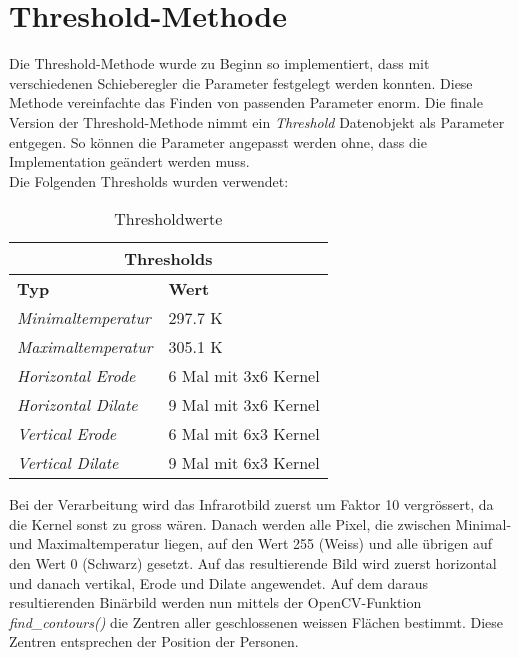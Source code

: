 \section{Threshold-Methode}

Die Threshold-Methode wurde zu Beginn so implementiert, dass mit verschiedenen Schieberegler die Parameter festgelegt werden konnten. Diese Methode vereinfachte das Finden von passenden Parameter enorm. Die finale Version der Threshold-Methode nimmt ein \textit{Threshold} Datenobjekt als Parameter entgegen. So können die Parameter angepasst werden ohne, dass die Implementation geändert werden muss.\\
Die Folgenden Thresholds wurden verwendet:

{
	\renewcommand{\arraystretch}{1.3}

	\begin{table}[H]
		\scriptsize
		\centering
		\begin{tabularx}{.6\textwidth}{XX}\\
			\multicolumn{2}{c}{\textbf{Thresholds}}\\
			\hline
			\textbf{Typ} & \textbf{Wert}\\
			\hline
			\textit{Minimaltemperatur} & 297.7 K\\
			\hline
			\textit{Maximaltemperatur} & 305.1 K\\
			\hline 
			\textit{Horizontal \gls{Erode}} & 6 Mal mit 3x6 Kernel\\
			\hline
			\textit{Horizontal \gls{Dilate}} & 9 Mal mit 3x6 Kernel\\
			\hline
			\textit{Vertical \gls{Erode}} & 6 Mal mit 6x3 Kernel\\
			\hline
			\textit{Vertical \gls{Dilate}} & 9  Mal mit 6x3 Kernel\\
			\hline
		\end{tabularx}
		\caption{Thresholdwerte}
		\label{tbl:thresholds}
	\end{table}
}

\noindent
Bei der Verarbeitung wird das Infrarotbild zuerst um Faktor 10 vergrössert, da die Kernel sonst zu gross wären. Danach werden alle Pixel, die zwischen Minimal- und Maximaltemperatur liegen, auf den Wert 255 (Weiss) und alle übrigen auf den Wert 0 (Schwarz) gesetzt. Auf das resultierende Bild wird zuerst horizontal und danach vertikal, \gls{Erode} und \gls{Dilate} angewendet. Auf dem daraus resultierenden Binärbild werden nun mittels der OpenCV-Funktion \textit{find\_contours()} die Zentren aller geschlossenen weissen Flächen bestimmt. Diese Zentren entsprechen der Position der Personen.



